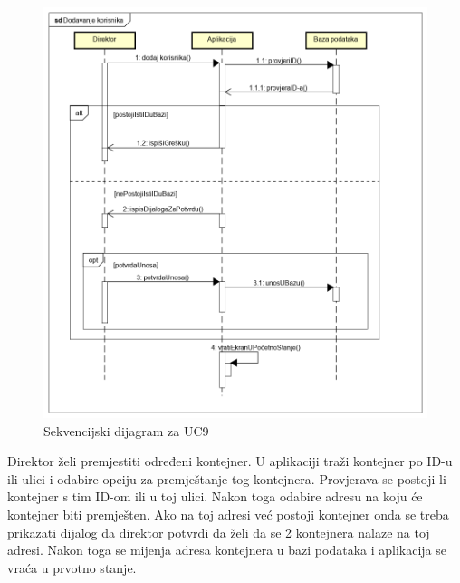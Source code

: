 			\begin{figure}
				\centering
				\includegraphics[width=1.0\linewidth]{slike/Sekvencijski dijagram za dodavanje korisnika.png}
				\caption{Sekvencijski dijagram za UC9}
				\label{fig:sekvencijski-dijagram-za-dodavanje-korisnika}
			\end{figure}
			
			\clearpage	 
			
			
			\noindent
			Direktor želi premjestiti određeni kontejner. U aplikaciji traži kontejner po ID-u ili ulici i odabire opciju za premještanje tog kontejnera. Provjerava se postoji li kontejner s tim ID-om ili u toj ulici. Nakon toga odabire adresu na koju će kontejner biti premješten. Ako na toj adresi već postoji kontejner onda se treba prikazati dijalog da direktor potvrdi da želi da se 2 kontejnera nalaze na toj adresi. Nakon toga se mijenja adresa kontejnera u bazi podataka i aplikacija se vraća u prvotno stanje.
			
			\clearpage	 
			
